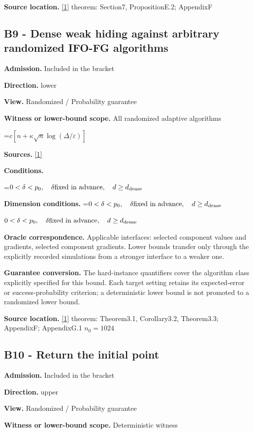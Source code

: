 \documentclass[10pt,a4paper]{article}
\newcommand{\AtlasMath}[1]{\par\begingroup\centering\setbox0=\hbox{$\displaystyle #1$}\ifdim\wd0>1.4\linewidth\typeout{ATLAS WIDE FORMULA: \the\wd0}\fi\ifdim\wd0>\linewidth\resizebox{\linewidth}{!}{\box0}\else\box0\fi\par\endgroup}
\newcommand{\AtlasInlineMath}[1]{\begingroup\setbox0=\hbox{$#1$}\ifdim\wd0>.4\linewidth\endgroup\AtlasMath{#1}\else\endgroup$#1$\fi}
\begin{document}
\textbf{Source location.} \href{https://arxiv.org/pdf/2609.00045v3}{[1]} theorem: Section7, PropositionE.2; AppendixF

\subsection{B9 - Dense weak hiding against arbitrary randomized IFO-FG algorithms}
\textbf{Admission.} Included in the bracket

\textbf{Direction.} lower

\textbf{View.} Randomized / Probability guarantee

\textbf{Witness or lower-bound scope.} All randomized adaptive algorithms

\AtlasMath{c[n+\kappa\sqrt n\log(\Delta/\varepsilon)]}
\textbf{Sources.} \href{https://arxiv.org/pdf/2609.00045v3}{[1]}

\textbf{Conditions.} 
\AtlasMath{0<\delta<p_0,\quad\delta\text{fixed in advance},\quad d\ge d_{\rm dense}}


\textbf{Dimension conditions.} \AtlasInlineMath{0<\delta<p_0,\quad\delta\text{fixed in advance},\quad d\ge d_{\rm dense}}

\textbf{Oracle correspondence.} Applicable interfaces: selected component values and gradients, selected component gradients. Lower bounds transfer only through the explicitly recorded simulations from a stronger interface to a weaker one.

\textbf{Guarantee conversion.} The hard-instance quantifiers cover the algorithm class explicitly specified for this bound. Each target setting retains its expected-error or success-probability criterion; a deterministic lower bound is not promoted to a randomized lower bound.

\textbf{Source location.} \href{https://arxiv.org/pdf/2609.00045v3}{[1]} theorem: Theorem3.1, Corollary3.2, Theorem3.3; AppendixF; AppendixG.1 $n_0=1024$

\subsection{B10 - Return the initial point}
\textbf{Admission.} Included in the bracket

\textbf{Direction.} upper

\textbf{View.} Randomized / Probability guarantee

\textbf{Witness or lower-bound scope.} Deterministic witness
\end{document}
